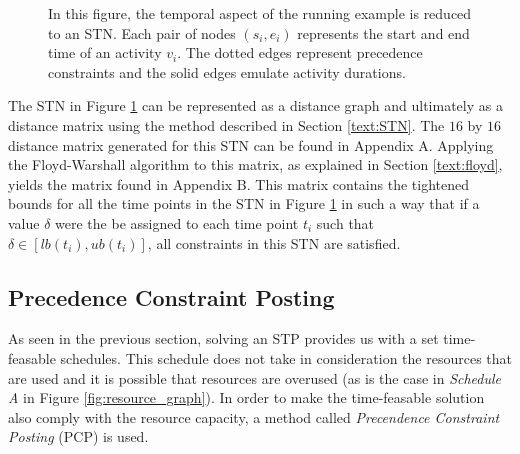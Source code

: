 \documentclass{article}
\theoremstyle{definition}
\begin{document}
\begin{figure}[h]
{
	}
	\caption{In this figure, the temporal aspect of the running example is reduced to an STN. Each pair of nodes $(s_i, e_i)$ represents the start and end time of an activity $v_i$. The dotted edges represent precedence constraints and the solid edges emulate activity durations.}
	\label{fig:stn}
\end{figure}

The STN in Figure \ref{fig:stn} can be represented as a distance graph and ultimately as a distance matrix using the method described in Section \ref{text:STN}. The $16$ by $16$ distance matrix generated for this STN can be found in Appendix A. Applying the Floyd-Warshall algorithm to this matrix, as explained in Section \ref{text:floyd}, yields the matrix found in Appendix B. This matrix contains the tightened bounds for all the time points in the STN in Figure \ref{fig:stn} in such a way that if a value $\delta$ were the be assigned to each time point $t_i$ such that $\delta \in [lb(t_i), ub(t_i)]$, all constraints in this STN are satisfied.

\subsection{Precedence Constraint Posting}
\label{text:PCP}
As seen in the previous section, solving an STP provides us with a set time-feasable schedules. 
This schedule does not take in consideration the resources that are used and it is possible that resources are overused (as is the case in \emph{Schedule A} in Figure \ref{fig:resource_graph}). 
In order to make the time-feasable solution also comply with the resource capacity, a method called \emph{Precendence Constraint Posting} (PCP) is used. 
\end{document}

